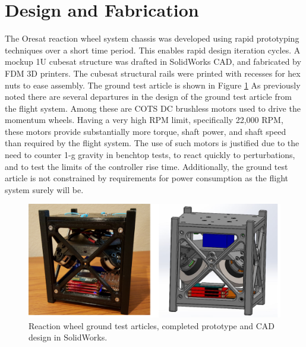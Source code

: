 \documentclass[]{aiaa-tc}%
\begin{document}
\section{Design and Fabrication}
	The Oresat reaction wheel system chassis was developed using rapid prototyping techniques over a short time period. This enables rapid design iteration cycles. A mockup 1U cubesat structure was drafted in SolidWorks CAD, and fabricated by FDM 3D printers. The cubesat structural rails were printed with recesses for hex nuts to ease assembly. The ground test article is shown in Figure \ref{fig:rcs} As previously noted there are several departures in the design of the ground test article from the flight system. Among these are COTS DC brushless motors used to drive the momentum wheels. Having a very high RPM limit, specifically 22,000 RPM, these motors provide substantially more torque, shaft power, and shaft speed than required by the flight system. The use of such motors is justified due to the need to counter 1-g gravity in benchtop tests, to react quickly to perturbations, and to test the limits of the controller rise time. Additionally, the ground test article is not constrained by requirements for power consumption as the flight system surely will be. 

\begin{figure}[h!]
  \centering
  \includegraphics[width=0.7\linewidth]{20160224_195322.png}
  \caption{Reaction wheel ground test articles, completed prototype and CAD design in SolidWorks.}
  \label{fig:rcs}
\end{figure}
\end{document}
